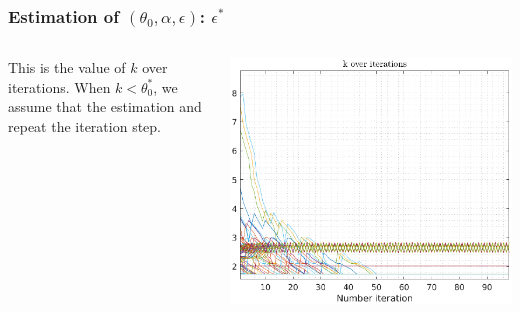 \documentclass[aspectratio=169]{beamer}\usepackage[utf8]{inputenc}
\begin{document}
\begin{frame}\frametitle{Estimation of $(\theta_0,\alpha,\epsilon)$: $\epsilon^*$}

\begin{columns}

This is the value of $k$ over iterations. When $k<\theta^*_0$, we assume that the estimation and repeat the iteration step.

\includegraphics[width=1.1\textwidth]{../../MATLAB_Files/Results/epsilon/theta_t.eps}
\end{columns}

\end{frame}
\end{document}
